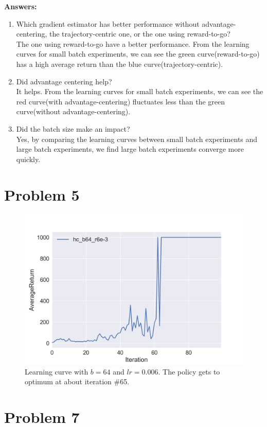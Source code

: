 \documentclass[12pt]{article}
\begin{document}
\textbf{Answers:}\\
\begin{enumerate}
\item Which gradient estimator has better performance without advantage-centering, the trajectory-centric one, or the one using reward-to-go?\\
The one using reward-to-go have a better performance. From the learning curves for small batch experiments, we can see the green curve(reward-to-go) has a high average return than the blue curve(trajectory-centric).
\item Did advantage centering help?\\
It helps. From the learning curves for small batch experiments, we can see the red curve(with advantage-centering) fluctuates less than the green curve(without advantage-centering).
\item Did the batch size make an impact?\\
Yes, by comparing the learning curves between small batch experiments and large batch experiments, we find large batch experiments converge more quickly.
\end{enumerate}


\section{Problem 5}

\begin{figure}[!h]
\centering
\includegraphics[width=5in]{Figure_3.png}
\caption{Learning curve with $b = 64$ and $lr = 0.006$. The policy gets to optimum at about iteration \#65.}
\end{figure}

\section{Problem 7}
\end{document}

